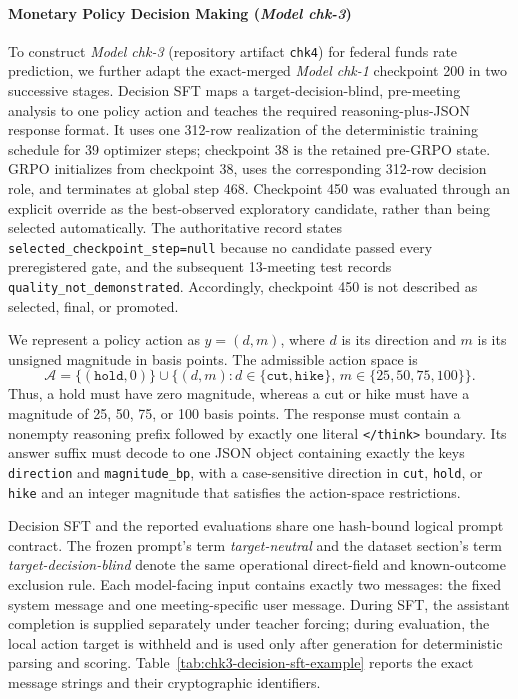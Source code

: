 \paragraph*{Monetary Policy Decision Making (\textit{Model chk-3})}
To construct \textit{Model chk-3} (repository artifact \texttt{chk4}) for
federal funds rate prediction, we further adapt the exact-merged
\textit{Model chk-1} checkpoint 200 in two successive stages. Decision SFT maps
a target-decision-blind, pre-meeting analysis to one policy action and teaches
the required reasoning-plus-JSON response format. It uses one 312-row
realization of the deterministic training schedule for 39 optimizer steps;
checkpoint 38 is the retained pre-GRPO state. GRPO initializes from checkpoint
38, uses the corresponding 312-row decision role, and terminates at global step
468. Checkpoint 450 was evaluated through an explicit override as the
best-observed exploratory candidate, rather than being selected automatically.
The authoritative record states
\texttt{selected\_checkpoint\_step=null} because no candidate passed every
preregistered gate, and the subsequent 13-meeting test records
\texttt{quality\_not\_demonstrated}. Accordingly, checkpoint 450 is not described
as selected, final, or promoted.

We represent a policy action as $y=(d,m)$, where $d$ is its direction and $m$
is its unsigned magnitude in basis points. The admissible action space is
\begin{equation*}
    \mathcal{A}
    = \{(\texttt{hold},0)\}
    \cup
    \{(d,m):d\in\{\texttt{cut},\texttt{hike}\},\,
    m\in\{25,50,75,100\}\}.
\end{equation*}
Thus, a hold must have zero magnitude, whereas a cut or hike must have a
magnitude of 25, 50, 75, or 100 basis points. The response must contain a
nonempty reasoning prefix followed by exactly one literal
\texttt{</think>} boundary. Its answer suffix must decode
to one JSON object containing exactly the keys \texttt{direction} and
\texttt{magnitude\_bp}, with a case-sensitive direction in
\texttt{cut}, \texttt{hold}, or \texttt{hike} and an integer magnitude that
satisfies the action-space restrictions.

Decision SFT and the reported evaluations share one hash-bound logical prompt
contract. The frozen prompt's term \emph{target-neutral} and the dataset
section's term \emph{target-decision-blind} denote the same operational
direct-field and known-outcome exclusion rule. Each model-facing input contains
exactly two messages: the fixed
system message and one meeting-specific user message. During SFT, the assistant
completion is supplied separately under teacher forcing; during evaluation,
the local action target is withheld and is used only after generation for
deterministic parsing and scoring. Table~\ref{tab:chk3-decision-sft-example}
reports the exact message strings and their cryptographic identifiers.





